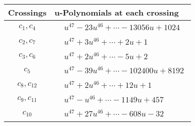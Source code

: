 \documentclass[1p]{elsarticle_modified}
\theoremstyle{definition}
\begin{document}
\begin{tabular}{m{50pt}|m{274pt}}
Crossings & \hspace{64pt}u-Polynomials at each crossing \\
\hline $$\begin{aligned}c_{1},c_{4}\end{aligned}$$&$\begin{aligned}
&u^{47}-23 u^{46}+\cdots-13056 u+1024
\end{aligned}$\\
\hline $$\begin{aligned}c_{2},c_{7}\end{aligned}$$&$\begin{aligned}
&u^{47}+3 u^{46}+\cdots+2 u+1
\end{aligned}$\\
\hline $$\begin{aligned}c_{3},c_{6}\end{aligned}$$&$\begin{aligned}
&u^{47}+2 u^{46}+\cdots-5 u+2
\end{aligned}$\\
\hline $$\begin{aligned}c_{5}\end{aligned}$$&$\begin{aligned}
&u^{47}-39 u^{46}+\cdots-102400 u+8192
\end{aligned}$\\
\hline $$\begin{aligned}c_{8},c_{12}\end{aligned}$$&$\begin{aligned}
&u^{47}+2 u^{46}+\cdots+12 u+1
\end{aligned}$\\
\hline $$\begin{aligned}c_{9},c_{11}\end{aligned}$$&$\begin{aligned}
&u^{47}- u^{46}+\cdots-1149 u+457
\end{aligned}$\\
\hline $$\begin{aligned}c_{10}\end{aligned}$$&$\begin{aligned}
&u^{47}+27 u^{46}+\cdots-608 u-32
\end{aligned}$\\
\hline
\end{tabular}\\~\\
\newpage\renewcommand{\arraystretch}{1}
\end{document}
